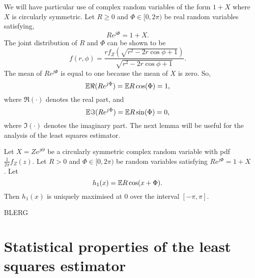 \documentclass[journal]{IEEEtran}
\begin{document}
We will have particular use of complex random variables of the form $1 + X$ where $X$ is circularly symmetric.  Let $R \geq 0$ and $\Phi \in [0,2\pi)$ be real random variables satisfying, 
\[
R e^{j\Phi} = 1 + X.
\]
The joint distribution of $R$ and $\Phi$ can be shown to be
\[
f(r,\phi) = \frac{r f_Z(\sqrt{r^2 - 2r\cos\phi + 1})}{\sqrt{r^2 - 2r\cos\phi + 1}}.
\]
The mean of $R e^{j\Phi}$ is equal to one because the mean of $X$ is zero.  So,
\[
{\mathbb E} \Re(R e^{j\Phi}) = {\mathbb E} R \cos(\Phi) = 1,
\]
where $\Re(\cdot)$ denotes the real part, and
\[
{\mathbb E} \Im(R e^{j\Phi}) = {\mathbb E} R \sin(\Phi) = 0,
\]
where $\Im(\cdot)$ denotes the imaginary part.  The next lemma will be useful for the analysis of the least squares estimator.

\begin{lemma}\label{lem:h1minedcircsym}
Let $X = Z e^{j\Theta}$ be a circularly symmetric complex random variable with pdf $\tfrac{1}{2\pi}f_Z(z)$.  Let $R > 0$ and $\Phi \in [0, 2\pi)$ be random variables satisfying $R e^{j\Phi} = 1 + X$.  Let
\[
h_1(x) = {\mathbb E} R \cos(x + \Phi).
\]
Then $h_1(x)$ is uniquely maximised at $0$ over the interval $[-\pi,\pi]$.
\end{lemma}

\begin{IEEEproof}
BLERG
\end{IEEEproof}


\section{Statistical properties of the least squares estimator}\label{sec:stat-prop-least}
\end{document}
